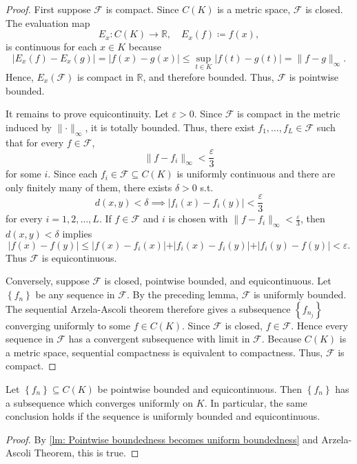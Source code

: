 \begin{proof}
    First suppose \(\mathcal{F}\) is compact. Since \(C(K)\) is a metric space, \(\mathcal{F} \) is closed. The evaluation map 
    \[
        E_x : C(K) \to \mathbb{R}, \quad E_x(f) \coloneqq f(x),
    \]   
    is continuous for each \(x \in K\) because
    \[
        \vert E_x(f) - E_x(g) \vert = \vert f(x) - g(x) \vert \le \sup_{t \in K} \vert f(t) - g(t) \vert = \lVert f - g \rVert_{\infty}. 
    \]
    Hence, \(E_x(\mathcal{F})\) is compact in \(\mathbb{R}\), and therefore bounded. Thus, \(\mathcal{F} \) is pointwise bounded.

    It remains to prove equicontinuity. Let \(\varepsilon > 0\). Since \(\mathcal{F} \) is compact in the metric induced by \(\lVert \cdot \rVert_\infty  \), it is totally bounded. Thus, there exist \(f_1, \dots , f_L \in \mathcal{F}\) such that for every \(f \in \mathcal{F}\), 
    \[
        \lVert f - f_i \rVert_\infty < \frac{\varepsilon}{3} 
    \]         
    for some \(i\). Since each \(f_i \in \mathcal{F} \subseteq C(K)\) is uniformly continuous and there are only finitely many of them, there exists \(\delta > 0\) s.t. 
    \[
        d(x, y) < \delta \implies \vert f_i(x) - f_i(y) \vert < \frac{\varepsilon}{3} 
    \]   
    for every \(i = 1, 2, \dots , L\). If \(f \in \mathcal{F}\) and \(i\) is chosen with \(\lVert f - f_i \rVert_\infty < \frac{\varepsilon}{3} \), then \(d(x, y) < \delta\) implies  
    \[
        \vert f(x) - f(y) \vert \le \vert f(x) - f_i(x) \vert + \vert f_i(x) - f_i(y) \vert + \vert f_i(y) - f(y) \vert < \varepsilon.    
    \]    
    Thus \(\mathcal{F}\) is equicontinuous. 

    Conversely, suppose \(\mathcal{F} \) is closed, pointwise bounded, and equicontinuous. Let \(\left\{ f_n \right\} \) be any sequence in \(\mathcal{F}\). By the preceding lemma, \(\mathcal{F} \) is uniformly bounded. The sequential Arzela-Ascoli theorem therefore gives a subsequence \(\left\{ f_{n_j} \right\} \) converging uniformly to some \(f \in C(K)\). Since \(\mathcal{F}\) is closed, \(f \in \mathcal{F}\). Hence every sequence in \(\mathcal{F} \) has a convergent subsequence with limit in \(\mathcal{F}\). Because \(C(K)\) is a metric space, sequential compactness is equivalent to compactness. Thus, \(\mathcal{F} \) is compact.            
\end{proof}

\begin{corollary}
    Let \(\left\{ f_n \right\} \subseteq C(K) \) be pointwise bounded and equicontinuous. Then \(\left\{ f_n \right\} \) has a subsequence which converges uniformly on \(K\). In particular, the same conclusion holds if the sequence is uniformly bounded and equicontinuous.
\end{corollary}
\begin{proof}
    By \autoref{lm: Pointwise boundedness becomes uniform boundedness} and Arzela-Ascoli Theorem, this is true. 
\end{proof}


